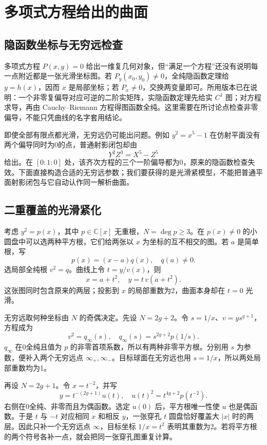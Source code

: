 \section{多项式方程给出的曲面}
\label{b3:sec:A04}

\subsection{隐函数坐标与无穷远检查}
\label{b3:subsec:A0401}

多项式方程 \(P(x,y)=0\) 给出一维复几何对象，但“满足一个方程”还没有说明每一点附近都是一张光滑坐标图。若 \(P_y(x_0,y_0)\ne0\)，全纯隐函数定理给 \(y=h(x)\)，因而 \(x\) 是局部坐标；若 \(P_x\ne0\)，交换两变量即可。所用版本已在说明：一个非零复偏导对应可逆的二阶实矩阵，实隐函数定理先给实 \(C^1\) 图；对方程求导，再由 Cauchy--Riemann 方程得图函数全纯。这里需要在所讨论点检查非零偏导，不能只凭曲线的名字套用结论。

\ProseParagraphBreak
即使全部有限点都光滑，无穷远仍可能出问题。例如 \(y^2=x^5-1\) 在仿射平面没有两个偏导同时为0的点，普通射影闭包却由
\[
 Y^2Z^3=X^5-Z^5
\]
给出。在 \([0:1:0]\) 处，该齐次方程的三个一阶偏导都为0，原来的隐函数检查失效。下面直接构造合适的无穷远参数；我们要获得的是光滑紧模型，不能把普通平面射影闭包与它自动认作同一解析曲面。

\subsection{二重覆盖的光滑紧化}
\label{b3:subsec:A0402}

考虑 \(y^2=p(x)\)，其中 \(p\in\mathbb C[x]\) 无重根，\(N=\deg p\ge3\)。在 \(p(x)\ne0\) 的小圆盘中可以选两种平方根，它们给两张以 \(x\) 为坐标的互不相交的图。若 \(a\) 是简单根，写
\[
 p(x)=(x-a)q(x),\quad q(a)\ne0.
\]
选局部全纯根 \(v^2=q\)。曲线上令 \(t=y/v(x)\)，则
\[
 x=a+t^2,\quad y=t\,v(a+t^2).
\]
这张图同时包含原来的两层；投影到 \(x\) 的局部重数为2，曲面本身却在 \(t=0\) 光滑。

\ProseParagraphBreak
无穷远取何种坐标由 \(N\) 的奇偶决定。先设 \(N=2g+2\)。令 \(s=1/x\)、\(v=y s^{g+1}\)，方程成为
\[
 v^2=q_\infty(s),\quad
 q_\infty(s)=s^{2g+2}p(1/s).
\]
\(q_\infty\) 在0全纯且值为 \(p\) 的非零首项系数，所以有两种非零平方根。分别用 \(s\) 为参数，便补入两个无穷远点 \(\infty_+,\infty_-\)。目标球面在无穷远也用 \(s=1/x\)，所以两处局部重数均为1。

\ProseParagraphBreak
再设 \(N=2g+1\)。令 \(x=t^{-2}\)，并写
\[
 y=t^{-(2g+1)}u(t),\quad
 u(t)^2=t^{4g+2}p(t^{-2}).
\]
右侧在0全纯、非零而且为偶函数。选定 \(u(0)\) 后，平方根唯一性使 \(u\) 也是偶函数。于是 \(t\) 与 \(-t\) 对应相同 \(x\) 和相反 \(y\)，一张穿孔 \(t\) 圆盘恰好覆盖大 \(|x|\) 时的两层。因此只补一个无穷远点 \(\infty\)，目标坐标 \(1/x=t^2\) 表明其重数为2。若将平方根的两个符号各补一点，就会把同一张穿孔图重复计算。


